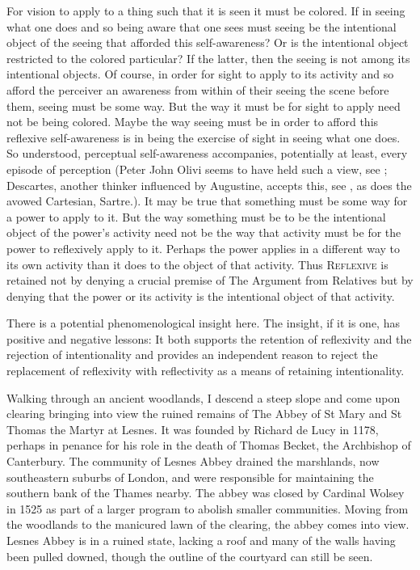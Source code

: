 For vision to apply to a thing such that it is seen it must be colored. If in seeing what one does and so being aware that one sees must seeing be the intentional object of the seeing that afforded this self-awareness? Or is the intentional object restricted to the colored particular? If the latter, then the seeing is not among its intentional objects. Of course, in order for sight to apply to its activity and so afford the perceiver an awareness from within of their seeing the scene before them, seeing must be some way. But the way it must be for sight to apply need not be being colored. Maybe the way seeing must be in order to afford this reflexive self-awareness is in being the exercise of sight in seeing what one does. So understood, perceptual self-awareness accompanies, potentially at least, every episode of perception (Peter John Olivi seems to have held such a view, see \citealt{Brower-Toland:2024qa}; Descartes, another thinker influenced by Augustine, accepts this, see \citealt{Menn:1998nr}, as does the avowed Cartesian, Sartre.). It may be true that something must be some way for a power to apply to it. But the way something must be to be the intentional object of the power's activity need not be the way that activity must be for the power to reflexively apply to it. Perhaps the power applies in a different way to its own activity than it does to the object of that activity. Thus \textsc{Reflexive} is retained not by denying a crucial premise of The Argument from Relatives but by denying that the power or its activity is the intentional object of that activity.

There is a potential phenomenological insight here. The insight, if it is one, has positive and negative lessons: It both supports the retention of reflexivity and the rejection of intentionality and provides an independent reason to reject the replacement of reflexivity with reflectivity as a means of retaining intentionality. 

Walking through an ancient woodlands, I descend a steep slope and come upon clearing bringing into view the ruined remains of The Abbey of St Mary and St Thomas the Martyr at Lesnes. It was founded by Richard de Lucy in 1178, perhaps in penance for his role in the death of Thomas Becket, the Archbishop of Canterbury. The community of Lesnes Abbey drained the marshlands, now southeastern suburbs of London, and were responsible for maintaining the southern bank of the Thames nearby. The abbey was closed by Cardinal Wolsey in 1525 as part of a larger program to abolish smaller communities. Moving from the woodlands to the manicured lawn of the clearing, the abbey comes into view. Lesnes Abbey is in a ruined state, lacking a roof and many of the walls having been pulled downed, though the outline of the courtyard can still be seen.

